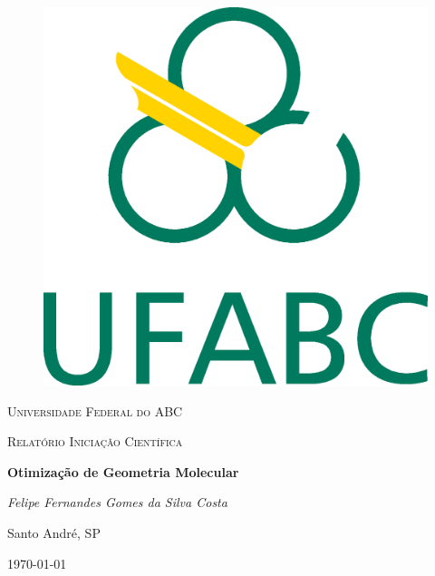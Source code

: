 \thispagestyle{empty}

\begin{figure}
	\centering
	\includegraphics[scale = 0.3]{figures/logo_ufabc.eps}
	\label{fig:UFABC_logo}
\end{figure}

\begin{center}
	
	{\scshape\LARGE Universidade Federal do ABC \par}
	\vspace{1.5cm}
	{\scshape\Large Relatório Iniciação Científica \par}
	\vspace{1.5cm}
	{\huge \bfseries Otimização de Geometria Molecular \par}
	\vspace{2cm}
	{\LARGE \itshape Felipe Fernandes Gomes da Silva Costa \par}
	
	\vfill
	
	{\large Santo André, SP \par}	
	{\large \today \par}
	
\end{center}
